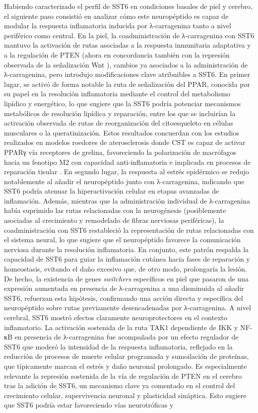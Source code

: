 \documentclass[10pt,a4paper]{article}
\begin{document}
Habiendo caracterizado el perfil de SST6 en condiciones basales de piel y cerebro, el siguiente paso consistió en analizar cómo este neuropéptido es capaz de modular la respuesta inflamatoria inducida por λ-carragenina tanto a nivel periférico como central. En la piel, la coadministración de λ-carragenina con SST6 mantuvo la activación de rutas asociadas a la respuesta inmunitaria adaptativa y a la regulación de PTEN (ahora en concordancia también con la represión observada de la señalización Wnt \parencite{Ma2016}), cambios ya asociados a la administración de λ-carragenina, pero introdujo modificaciones clave atribuibles a SST6. En primer lugar, se activó de forma notable la ruta de señalización del PPAR, conocida por su papel en la resolución inflamatoria mediante el control del metabolismo lipídico y energético, lo que sugiere que la SST6 podría potenciar mecanismos metabólicos de resolución lipídica y reparación, entre los que se incluirían la activación observada de rutas de reorganización del citoesqueleto en células musculares o la queratinización. Estos resultados concuerdan con los estudios realizados en modelos roedores de aterosclerosis donde CST es capaz de activar PPARγ vía receptores de grelina, favoreciendo la polarización de macrófagos hacia un fenotipo M2 con capacidad anti-inflamatoria e implicada en procesos de reparación tisular \parencite{DelgadoMaroto2017b}. En segundo lugar, la respuesta al estrés epidérmico se redujo notablemente al añadir el neuropéptido junto con λ-carragenina, indicando que SST6 podría atenuar la hiperactivación celular en etapas avanzadas de inflamación. Además, mientras que la administración individual de λ-carragenina había suprimido las rutas relacionadas con la neurogénesis (posiblemente asociadas al  crecimiento y remodelado de fibras nerviosas periféricas), la coadministración con SST6 restableció la representación de rutas relacionadas con el sistema neural, lo que sugiere que el neuropéptido favorece la comunicación nerviosa durante la resolución inflamatoria. En conjunto, este patrón respalda la capacidad de SST6 para guiar la inflamación cutánea hacia fases de reparación y homeostasis, evitando el daño excesivo que, de otro modo, prolongaría la lesión. De hecho, la existencia de genes \textit{switchers} específicos en piel que pasaron de una expresión aumentada en presencia de λ-carragenina a una disminuida al añadir SST6, refuerzan esta hipótesis, confirmando una acción directa y específica del neuropéptido sobre rutas previamente desencadenadas por λ-carragenina. A nivel cerebral, SST6 mostró efectos claramente neuroprotectores en el contexto inflamatorio. La activación sostenida de la ruta TAK1 dependiente de IKK y NF-κB en presencia de λ-carragenina fue acompañada por un efecto regulador de SST6 que moderó la intensidad de la respuesta inflamatoria, reflejado en la reducción de procesos de muerte celular programada y sumoilación de proteínas, que típicamente marcan el estrés y daño neuronal prolongado. Es especialmente relevante la represión sostenida de la vía de regulación de PTEN en el cerebro tras la adición de SST6, un mecanismo clave ya comentado en el control del crecimiento celular, supervivencia neuronal y plasticidad sináptica. Esto sugiere que SST6 podría estar favoreciendo vías neurotróficas y 
\end{document}
